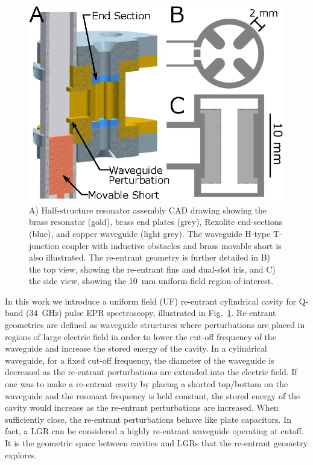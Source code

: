 \begin{figure}[htp]\centering
 \includegraphics{Kapitel/Ch2-Images/01-TE01UGeometry.eps}
 \caption[Resonator Assembly CAD Drawing.]{A) Half-structure resonator assembly CAD drawing showing the brass resonator (gold), brass end plates (grey), Rexolite end-sections (blue), and copper waveguide (light grey). The waveguide H-type T-junction coupler with inductive obstacles and brass movable short is also illustrated. The re-entrant geometry is further detailed in B) the top view, showing the re-entrant fins and dual-slot iris, and C) the side view, showing the 10~mm uniform field region-of-interest.}
 \label{Ch2-fig:GEO}
\end{figure}

In this work we introduce a uniform field (UF) re-entrant cylindrical \cylTE{} cavity for Q-band (34~GHz) pulse EPR spectroscopy, illustrated in Fig.~\ref{Ch2-fig:GEO}. Re-entrant geometries are defined as waveguide structures where perturbations are placed in regions of large electric field in order to lower the cut-off frequency of the waveguide and increase the stored energy of the cavity. \cite{ramo1984fields, MITRadWaveguide} In a cylindrical waveguide, for a fixed cut-off frequency, the diameter of the waveguide is decreased as the re-entrant perturbations are extended into the electric field. If one was to make a re-entrant cavity by placing a shorted top/bottom on the waveguide and the resonant frequency is held constant, the stored energy of the cavity would increase as the re-entrant perturbations are increased. When sufficiently close, the re-entrant perturbations behave like plate capacitors. In fact, a LGR can be considered a highly re-entrant waveguide operating at cutoff. It is the geometric space between cavities and LGRs that the re-entrant geometry explores. 

